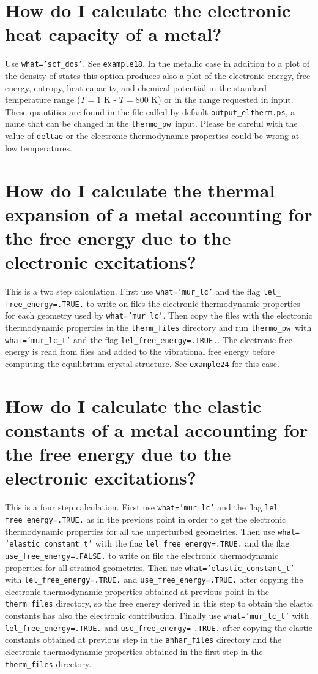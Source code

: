 \documentclass[12pt,a4paper]{article}
\def\thermo{\texttt{thermo\_pw}}
\begin{document}
\newpage
\section{\color{coral}How do I calculate the electronic heat capacity
of a metal?}
Use \texttt{what='scf\_dos'}. See \texttt{example18}. In the metallic
case in addition to a plot of the density of states this option produces
also a plot of the electronic energy, free energy, entropy, heat capacity,
and chemical potential in the standard temperature range 
($T=1$ K - $T=800$ K) or in the range requested in input.
These quantities are found in the file called by default
\texttt{output\_eltherm.ps}, a name that can be changed in the \thermo\ input.
Please be careful with the value of \texttt{deltae} or the electronic
thermodynamic properties could be wrong at low temperatures.

\newpage
\section{\color{coral}How do I calculate the thermal expansion of a metal
accounting for the free energy due to the electronic excitations?}
This is a two step calculation. First use \texttt{what='mur\_lc'} and
the flag \texttt{lel\_} \texttt{free\_energy=.TRUE.} to write on files the
electronic thermodynamic properties for each geometry used by
\texttt{what='mur\_lc'}. Then copy the files with
the electronic thermodynamic properties in the  
\texttt{therm\_files} directory and run \thermo\ with \texttt{what='mur\_lc\_t'}
and the flag \texttt{lel\_free\_energy=.TRUE.}. The electronic free energy
is read from files and added to the vibrational free energy before computing
the equilibrium crystal structure.
See \texttt{example24} for this case. 

\newpage
\section{\color{coral}How do I calculate the elastic constants of a metal
accounting for the free energy due to the electronic excitations?}
This is a four step calculation. First use \texttt{what='mur\_lc'} and
the flag \texttt{lel\_} \texttt{free\_energy=.TRUE.} as in the previous point
in order to get the electronic thermodynamic properties for all the 
unperturbed geometries. Then use \texttt{what=} \texttt{'elastic\_constant\_t'}
with the flag \texttt{lel\_free\_energy=.TRUE.} and the flag
\texttt{use\_free\_energy=.FALSE.} to write on file the electronic
thermodynamic properties for all strained geometries. Then use
\texttt{what='elastic\_constant\_t'} with \texttt{lel\_free\_energy=.TRUE.}
and \texttt{use\_free\_energy=.TRUE.} after copying the electronic
thermodynamic properties obtained at previous point in the 
\texttt{therm\_files} directory, so the 
free energy derived in this step to obtain the elastic constants 
has also the electronic contribution. 
Finally use \texttt{what='mur\_lc\_t'} with \texttt{lel\_free\_energy=.TRUE.}
and \texttt{use\_free\_energy=} \texttt{.TRUE.} after copying the elastic
constants obtained at previous step in the \texttt{anhar\_files} directory
and the electronic thermodynamic properties obtained in the first 
step in the \texttt{therm\_files} directory.
\end{document}

